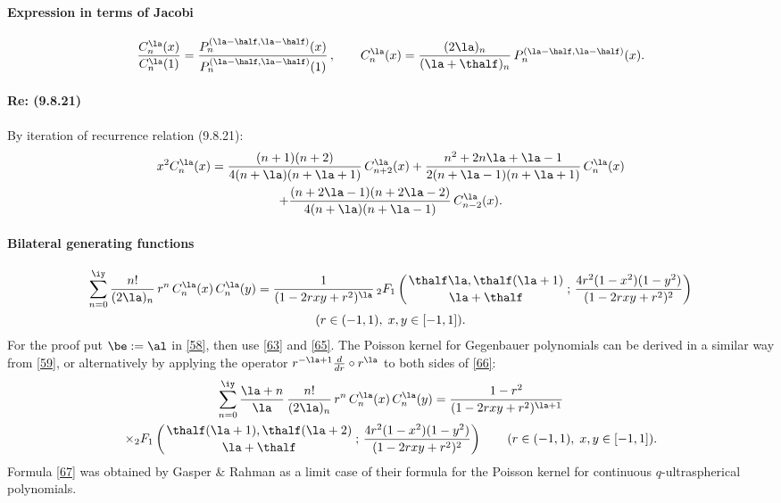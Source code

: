\documentclass[envcountchap,graybox]{svmono}
\newcounter{rom}
\newcommand{\hyp}[5]{\mbox{}_{#1}{F}_{#2}
\left(\genfrac{}{}{0pt}{}{#3}{#4}\,;\,#5\right)}
\begin{document}
\paragraph{Expression in terms of Jacobi}
%
\begin{equation}
\frac{C_n^\la(x)}{C_n^\la(1)}=
\frac{P_n^{(\la-\half,\la-\half)}(x)}{P_n^{(\la-\half,\la-\half)}(1)}\,,\qquad
C_n^\la(x)=\frac{(2\la)_n}{(\la+\thalf)_n}\,P_n^{(\la-\half,\la-\half)}(x).
\label{65}
\end{equation}
%
\paragraph{Re: (9.8.21)}
By iteration of recurrence relation (9.8.21):
\begin{multline}
x^2 C_n^\la(x)=
\frac{(n+1)(n+2)}{4(n+\la)(n+\la+1)}\,C_{n+2}^\la(x)+
\frac{n^2+2n\la+\la-1}{2(n+\la-1)(n+\la+1)}\,C_n^\la(x)\\
+\frac{(n+2\la-1)(n+2\la-2)}{4(n+\la)(n+\la-1)}\,C_{n-2}^\la(x).
\label{6}
\end{multline}
%
\paragraph{Bilateral generating functions}
\begin{multline}
\sum_{n=0}^\iy\frac{n!}{(2\la)_n}\,r^n\,C_n^\la(x)\,C_n^\la(y)
=\frac1{(1-2rxy+r^2)^\la}\,\hyp21{\thalf\la,\thalf(\la+1)}{\la+\thalf}
{\frac{4r^2(1-x^2)(1-y^2)}{(1-2rxy+r^2)^2}}\\
(r\in(-1,1),\;x,y\in[-1,1]).
\label{66}
\end{multline}
For the proof put $\be:=\al$ in \eqref{58}, then use \eqref{63} and \eqref{65}.
The Poisson kernel for Gegenbauer polynomials can be derived in a similar way
from \eqref{59}, or alternatively by applying the operator
$r^{-\la+1}\frac d{dr}\circ r^\la$ to both sides of \eqref{66}:
\begin{multline}
\sum_{n=0}^\iy\frac{\la+n}\la\,\frac{n!}{(2\la)_n}\,r^n\,C_n^\la(x)\,C_n^\la(y)
=\frac{1-r^2}{(1-2rxy+r^2)^{\la+1}}\\
\times\hyp21{\thalf(\la+1),\thalf(\la+2)}{\la+\thalf}
{\frac{4r^2(1-x^2)(1-y^2)}{(1-2rxy+r^2)^2}}\qquad
(r\in(-1,1),\;x,y\in[-1,1]).
\label{67}
\end{multline}
Formula \eqref{67} was obtained by Gasper \& Rahman 
as a limit case of their formula for the Poisson kernel for continuous
$q$-ultraspherical polynomials.
%
\end{document}
